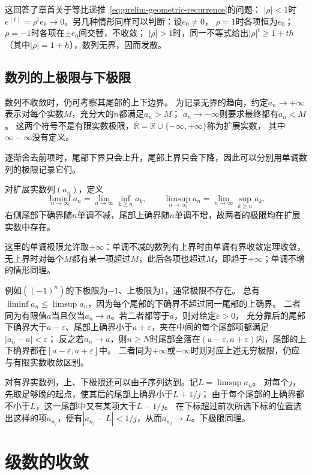 这回答了章首关于等比递推~\eqref{eq:prelim-geometric-recurrence}的问题：
$|\rho|<1$时$e^{(t)}=\rho^te_0\to0$。另几种情形同样可以判断：设$e_0\neq0$，
$\rho=1$时各项恒为$e_0$；$\rho=-1$时各项在$\pm e_0$间交替，不收敛；
$|\rho|>1$时，同一不等式给出$|\rho|^t\geq1+th$（其中$|\rho|=1+h$），数列无界，因而发散。

\subsection{数列的上极限与下极限}
数列不收敛时，仍可考察其尾部的上下边界。
为记录无界的趋向，约定$a_n\to+\infty$表示对每个实数$M$，充分大的$n$都满足$a_n>M$；
$a_n\to-\infty$则要求最终都有$a_n<M$。
这两个符号不是有限实数极限，$\overline{\mathbb R}=\mathbb R\cup\{-\infty,+\infty\}$称为扩展实数，
其中$\infty-\infty$没有定义。

逐渐舍去前项时，尾部下界只会上升，尾部上界只会下降，因此可以分别用单调数列的极限记录它们。
\begin{definition}[数列的上极限与下极限]
\label{def:analysis-liminf-limsup}
对扩展实数列$(a_n)$，定义
\[
 \liminf_{n\to\infty}a_n
 =\lim_{n\to\infty}\inf_{k\geq n}a_k,
 \qquad
 \limsup_{n\to\infty}a_n
 =\lim_{n\to\infty}\sup_{k\geq n}a_k.
\]
右侧尾部下确界随$n$单调不减，尾部上确界随$n$单调不增，故两者的极限均在扩展实数中存在。
\end{definition}
这里的单调极限允许取$\pm\infty$：单调不减的数列有上界时由单调有界收敛定理收敛，
无上界时对每个$M$都有某一项超过$M$，此后各项也超过$M$，即趋于$+\infty$；单调不增的情形同理。

例如$((-1)^n)$的下极限为$-1$、上极限为$1$，通常极限不存在。
总有$\liminf a_n\leq\limsup a_n$，因为每个尾部的下确界不超过同一尾部的上确界。
二者同为有限值$a$当且仅当$a_n\to a$。若二者都等于$a$，则对给定$\varepsilon>0$，
充分靠后的尾部下确界大于$a-\varepsilon$、尾部上确界小于$a+\varepsilon$，夹在中间的每个尾部项都满足$|a_n-a|<\varepsilon$；
反之若$a_n\to a$，则$n\geq N$时尾部全落在$(a-\varepsilon,a+\varepsilon)$内，尾部的上下确界都在$[a-\varepsilon,a+\varepsilon]$中。
二者同为$+\infty$或$-\infty$时则对应上述无穷极限，仍应与有限实数收敛区别。

对有界实数列，上、下极限还可以由子序列达到。记$L=\limsup a_n$。
对每个$j$，先取足够晚的起点，使其后的尾部上确界小于$L+1/j$；
由于每个尾部的上确界都不小于$L$，这一尾部中又有某项大于$L-1/j$。
在下标超过前次所选下标的位置选出这样的项$a_{n_j}$，便有$|a_{n_j}-L|<1/j$，从而$a_{n_j}\to L$。下极限同理。

\FloatBarrier
\section{级数的收敛}
\label{sec:analysis-series}

